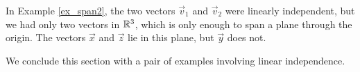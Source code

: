 \medskip

In Example \ref{ex_span2}, the two vectors $\vec{v}_1$ and $\vec{v}_2$ were linearly independent, but we had only two vectors in $\mathbb{R}^3$, which is only enough to span a plane through the origin. The vectors $\vec x$ and $\vec z$ lie in this plane, but $\vec y$ does not.

We conclude this section with a pair of examples involving linear independence.

\medskip

